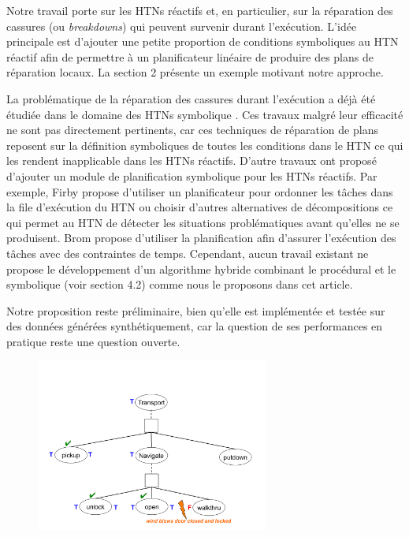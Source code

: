 \documentclass[a4paper,twoside,french]{article}
\begin{document}
				\par Notre travail porte sur les HTNs réactifs et, en particulier, sur la réparation des cassures (ou \emph{breakdowns}) qui peuvent survenir durant l'exécution. L'idée principale est d'ajouter une petite proportion de conditions symboliques au HTN réactif afin de permettre à un planificateur linéaire de produire des plans de réparation locaux. La section 2 présente un exemple motivant notre approche. 
				\par La problématique de la réparation des cassures durant l'exécution a déjà été étudiée dans le domaine des HTNs symbolique \cite{boella2002replanning,van2005plan,ayan2007hotride,warfield2007adaptation}. Ces travaux malgré leur efficacité ne sont pas directement pertinents, car ces techniques de réparation de plans reposent sur la définition symboliques de toutes les conditions dans le HTN ce qui les rendent inapplicable dans les HTNs réactifs.  D'autre travaux ont proposé d'ajouter un module de planification symbolique pour les HTNs réactifs. Par exemple, Firby \cite{firby1987investigation} propose d'utiliser un planificateur pour ordonner les tâches dans la file d'exécution du HTN ou choisir d'autres alternatives de décompositions ce qui permet au HTN de détecter les situations problématiques avant qu'elles ne se produisent. Brom \cite{brom2005hierarchical} propose d'utiliser la planification afin d'assurer l'exécution des tâches avec des contraintes de temps. Cependant, aucun travail existant ne propose le développement d'un algorithme hybride combinant le procédural et le symbolique (voir section 4.2) comme nous le proposons dans cet article.  
				\par Notre proposition reste préliminaire, bien qu'elle est implémentée et testée sur des données générées synthétiquement, car la question de ses performances en pratique reste une question ouverte. 
				\begin{figure}[t]
					\centerline{\includegraphics[width=3in]{figs/wind}}
					\vskip 8pt
				\end{figure}
	
\end{document}
